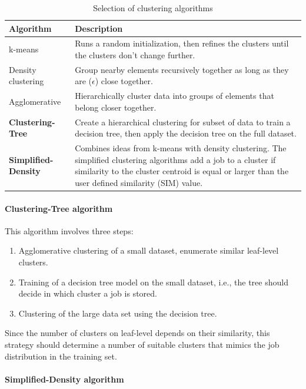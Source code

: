 \documentclass{jhps}
\begin{document}
\begin{table}
  \centering
  \begin{tabularx}{\textwidth}{lX}
    Algorithm & Description \\
    \midrule
    k-means & Runs a random initialization, then refines the clusters until the clusters don't change further.\\
    Density clustering &  Group nearby elements recursively together as long as they are ($\epsilon$) close together.\\
    Agglomerative &  Hierarchically cluster data into groups of elements that belong closer together.\\
    \textbf{Clustering-Tree} &  Create a hierarchical clustering for subset of data to train a decision tree, then apply the decision tree on the full dataset.\\
    \textbf{Simplified-Density} &  Combines ideas from k-means with density clustering.
The simplified clustering algorithms add a job to a cluster if similarity to the cluster centroid is equal or larger than the user defined similarity (SIM) value.\\
  \end{tabularx}
  \caption{Selection of clustering algorithms}
  \label{tab:clustering_algorithms}
\end{table}
\paragraph{Clustering-Tree algorithm}
This algorithm involves three steps:

\begin{enumerate}
 \item Agglomerative clustering of a small dataset, enumerate similar leaf-level clusters.
 \item Training of a decision tree model on the small dataset, i.e., the tree should decide in which cluster a job is stored.
 \item Clustering of the large data set using the decision tree.
\end{enumerate}

Since the number of clusters on leaf-level depends on their similarity, this strategy should determine a number of suitable clusters that mimics the job distribution in the training set.

\paragraph{Simplified-Density algorithm}
\end{document}
